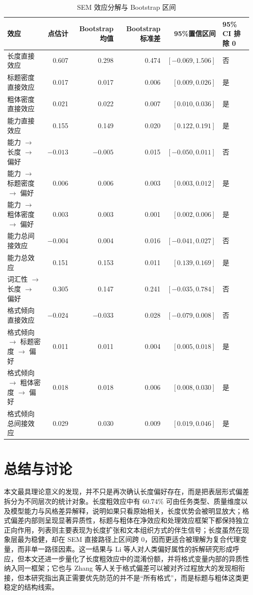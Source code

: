 \documentclass[9pt,a4paper,fontset=windows]{ctexart}
\theoremstyle{definition}
\numberwithin{equation}{section}
\begin{document}
\begin{table}[htbp]
\centering
\caption{SEM 效应分解与 Bootstrap 区间}
\label{tab:sem_effects}
\begin{tabular}{lrrrrl}
\toprule
效应 & 点估计 & Bootstrap 均值 & Bootstrap 标准差 & 95\%置信区间 & 95\% CI 排除 0 \\
\midrule
长度直接效应 & 0.607 & 0.298 & 0.474 & \([-0.069,1.506]\) & 否 \\
标题密度直接效应 & 0.017 & 0.017 & 0.006 & \([0.009,0.026]\) & 是 \\
粗体密度直接效应 & 0.021 & 0.022 & 0.007 & \([0.010,0.036]\) & 是 \\
能力直接效应 & 0.155 & 0.149 & 0.020 & \([0.122,0.191]\) & 是 \\
能力 \(\rightarrow\) 长度 \(\rightarrow\) 偏好 & \(-0.013\) & \(-0.005\) & 0.015 & \([-0.050,0.011]\) & 否 \\
能力 \(\rightarrow\) 标题密度 \(\rightarrow\) 偏好 & 0.006 & 0.006 & 0.003 & \([0.003,0.012]\) & 是 \\
能力 \(\rightarrow\) 粗体密度 \(\rightarrow\) 偏好 & 0.003 & 0.003 & 0.001 & \([0.002,0.006]\) & 是 \\
能力总间接效应 & \(-0.004\) & 0.004 & 0.016 & \([-0.041,0.027]\) & 否 \\
能力总效应 & 0.151 & 0.153 & 0.011 & \([0.139,0.169]\) & 是 \\
词汇性 \(\rightarrow\) 长度 \(\rightarrow\) 偏好 & 0.305 & 0.147 & 0.241 & \([-0.035,0.784]\) & 否 \\
格式倾向直接效应 & \(-0.024\) & \(-0.033\) & 0.028 & \([-0.079,0.008]\) & 否 \\
格式倾向 \(\rightarrow\) 标题密度 \(\rightarrow\) 偏好 & 0.011 & 0.011 & 0.004 & \([0.005,0.018]\) & 是 \\
格式倾向 \(\rightarrow\) 粗体密度 \(\rightarrow\) 偏好 & 0.018 & 0.018 & 0.006 & \([0.008,0.030]\) & 是 \\
格式倾向总间接效应 & 0.029 & 0.030 & 0.009 & \([0.019,0.046]\) & 是 \\
\bottomrule
\end{tabular}
\end{table}

\section{总结与讨论}

本文最具理论意义的发现，并不只是再次确认长度偏好存在，而是把表层形式偏差拆分为不同层次的统计对象。长度粗效应中有 \(60.74\%\) 可由任务类型、质量维度以及模型能力与风格差异解释，说明如果只看原始相关，长度优势会被明显放大；格式偏差内部则呈现显著异质性，标题与粗体在净效应和处理效应框架下都保持独立正向作用，列表则主要表现为长度扩张和文本组织方式的伴生信号；长度虽然在现象层最为稳健，却在 SEM 直接路径上区间跨 0，因而更适合被理解为复合代理变量，而非单一路径因素。这一结果与 Li 等人对人类偏好属性的拆解研究形成呼应，但本文还进一步量化了长度粗效应中的混淆份额，并将格式变量内部的异质性纳入同一框架；它也与 Zhang 等人关于格式偏差可以被对齐过程放大的发现相衔接，但本研究指出真正需要优先防范的并不是“所有格式”，而是标题与粗体这类更稳定的结构线索。
\end{document}
